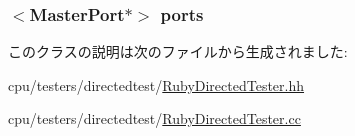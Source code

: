 \label{classRubyDirectedTester_aaebdb8b9bebab829bd0d1863bd3cfd1d}
\hypertarget{classRubyDirectedTester_a9b3aedb8e244949f057468d6ba55c41a}{
\subsubsection[{ports}]{$<${\bf MasterPort}$\ast$$>$ {\bf ports}}}
\label{classRubyDirectedTester_a9b3aedb8e244949f057468d6ba55c41a}


このクラスの説明は次のファイルから生成されました:\begin{DoxyCompactItemize}
\item 
cpu/testers/directedtest/\hyperlink{RubyDirectedTester_8hh}{RubyDirectedTester.hh}\item 
cpu/testers/directedtest/\hyperlink{RubyDirectedTester_8cc}{RubyDirectedTester.cc}\end{DoxyCompactItemize}
